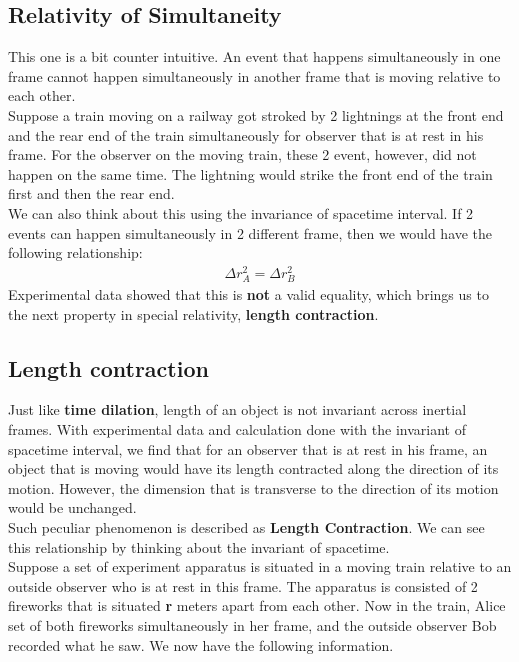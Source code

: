 \documentclass[12pt]{book}
\begin{document}
\subsection{Relativity of Simultaneity}
This one is a bit counter intuitive. An event that happens simultaneously in one frame cannot happen simultaneously in another frame that is moving relative to each other. \\
\newline 
Suppose a train moving on a railway got stroked by 2 lightnings at the front end and the rear end of the train simultaneously for observer that is at rest in his frame. For the observer on the moving train, these 2 event, however, did not happen on the same time. The lightning would strike the front end of the train first and then the rear end. 
\\
\newline
We can also think about this using the invariance of spacetime interval. If 2 events can happen simultaneously in 2 different frame, then we would have the following relationship:
\begin{align}
\Delta r_A^2 = \Delta r_B^2
\end{align}
Experimental data showed that this is \textbf{not} a valid equality, which brings us to the next property in special relativity, \textbf{length contraction}.
\subsection{Length contraction}
Just like \textbf{time dilation}, length of an object is not invariant across inertial frames. With experimental data and calculation done with the invariant of spacetime interval, we find that for an observer that is at rest in his frame, an object that is moving would have its length contracted along the direction of its motion. However, the dimension that is transverse to the direction of its motion would be unchanged. \\
\newline
Such peculiar phenomenon is described as \textbf{Length Contraction}. We can see this relationship by thinking about the invariant of spacetime. \\
\newline
Suppose a set of experiment apparatus is situated in a moving train relative to an outside observer who is at rest in this frame. The apparatus is consisted of 2 fireworks that is situated \textbf{r} meters apart from each other. Now in the train, Alice set of both fireworks simultaneously in her frame, and the outside observer Bob recorded what he saw. We now have the following information.
\\
\newline
\end{document}
